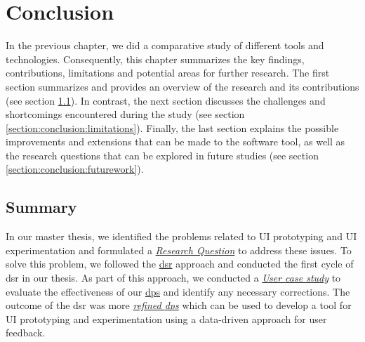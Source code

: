
\chapter{Conclusion}
\label{chap:conclusion}
In the previous chapter, we did a comparative study of different tools and technologies. 
Consequently, this chapter summarizes the key findings, contributions, limitations and potential areas for further research. 
The first section summarizes and provides an overview of the research and its contributions (see section \ref{section:conclusion:summary}). 
In contrast, the next section discusses the challenges and shortcomings encountered during the study (see section \ref{section:conclusion:limitations}). 
Finally, the last section explains the possible improvements and extensions that can be made to the software tool, as well as the research questions that can be explored in future studies (see section \ref{section:conclusion:futurework}).

\ifpdf
    \graphicspath{{Chapters/Conclusion/Figs/}{Chapters/Conclusion/Figs/}{Chapters/Conclusion/Figs/}}
\else
    \graphicspath{{Chapters/Conclusion/Figs/}{Chapters/Conclusion/Figs/}}
\fi

\section{Summary}
\label{section:conclusion:summary}
In our master thesis, we identified the problems related to UI prototyping and UI experimentation and formulated a \textit{\hyperref[introduction:section:research]{Research Question}} to address these issues. 
To solve this problem, we followed the \hyperref[introduction:section:research]{\ac{dsr}} approach and conducted the first cycle of \ac{dsr} in our thesis.
As part of this approach, we conducted a \textit{\hyperref[evaluation:section:casestudy]{User case study}} to evaluate the effectiveness of our \hyperref[design:section:designprinciple]{\ac{dp}s} and identify any necessary corrections. 
The outcome of the \ac{dsr} was more \textit{\hyperref[evaluation:section:interpretation]{refined \ac{dp}s}} which can be used to develop a tool for UI prototyping and experimentation using a data-driven approach for user feedback.

